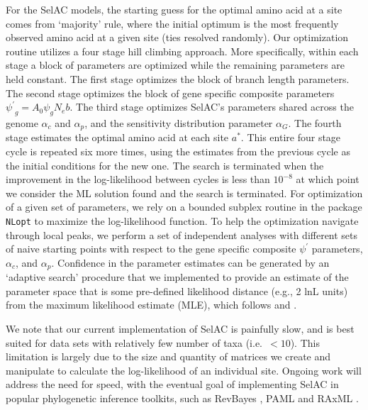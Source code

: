 \documentclass[12pt,letterpaper,fleqn]{article}
\newcommand{\Ne}{\ensuremath{{N_e}}\xspace} %
\newcommand{\selac}{SelAC\xspace}
\newcommand{\alphac}{\ensuremath{\alpha_c}\xspace}
\newcommand{\alphag}{\ensuremath{\alpha_G}\xspace}
\newcommand{\alphap}{\ensuremath{\alpha_p}\xspace}
\newcommand{\aopt}{\ensuremath{a^*}\xspace}
\newcommand{\psiprime}{\ensuremath{\psi^\prime}\xspace}
\begin{document}
For the \selac models, the starting guess for the optimal amino acid at a site comes from `majority' rule, where the initial optimum is the most frequently observed amino acid at a given site (ties resolved randomly).
Our optimization routine utilizes a four stage hill climbing approach.
More specifically, within each stage a block of parameters are optimized while the remaining parameters are held constant.
The first stage optimizes the block of branch length parameters.
The second stage optimizes the block of gene specific composite parameters $ \psiprime_g = A_0 \psi_g \Ne b$.
The third stage optimizes \selac's parameters shared across the genome $\alphac$ and $\alphap$, and the sensitivity distribution parameter $\alphag$.
The fourth stage estimates the optimal amino acid at each site \aopt.
This entire four stage cycle is repeated six more times, using the estimates from the previous cycle as the initial conditions for the new one.
The search is terminated when the improvement in the log-likelihood between cycles is less than $10^{-8}$ at which point we consider the ML solution found and the search is terminated.
For optimization of a given set of parameters, we rely on a bounded subplex routine \citep{Rowan1990} in the package \texttt{NLopt} \citep{Johnson2012} to maximize the log-likelihood function.
To help the optimization navigate through local peaks, we perform a set of independent analyses with different sets of naive starting points with respect to the gene specific composite $\psiprime$ parameters, $\alphac$, and $\alphap$.
Confidence in the parameter estimates can be generated by an `adaptive search' procedure that we implemented to provide an estimate of the parameter space that is some pre-defined likelihood distance (e.g., 2 lnL units) from the maximum likelihood estimate (MLE), which follows \citet{BeaulieuAndOMeara2016} and \citet{edwards1984likelihood}.

We note that our current implementation of \selac is painfully slow, and is best suited for data sets with relatively few number of taxa (i.e.~$<10$).
This limitation is largely due to the size and quantity of matrices we create and manipulate to calculate the log-likelihood of an individual site.
Ongoing work will address the need for speed, with the eventual goal of implementing \selac in popular phylogenetic inference toolkits, such as RevBayes \citep{revbayes}, PAML \citep{Yang2007} and RAxML \citep{Stamatakis2006}.
\end{document}

